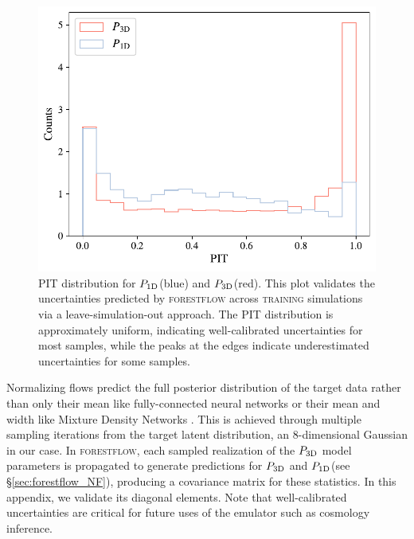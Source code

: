 \documentclass{aa}
\newcommand{\poned}{\ensuremath{P_{\rm 1D}}\xspace}
\newcommand{\pthreed}{\ensuremath{P_{\rm 3D}}\xspace}
\newcommand{\forestflow}{\textsc{forestflow}\xspace}
\newcommand{\lacehc}{\textsc{training}\xspace}
\begin{document}
\begin{appendix}
\begin{figure}
    \centering\includegraphics[width=\columnwidth]{figures/PIT_P3D.pdf}
    \caption{PIT distribution for \poned (blue) and \pthreed (red). This plot validates the uncertainties predicted by \forestflow across \lacehc simulations via a leave-simulation-out approach. The PIT distribution is approximately uniform, indicating well-calibrated uncertainties for most samples, while the peaks at the edges indicate underestimated uncertainties for some samples.}
    \label{fig:PIT}
\end{figure}

Normalizing flows predict the full posterior distribution of the target data rather than only their mean like fully-connected neural networks or their mean and width like Mixture Density Networks \citep[see][for some applications in cosmology]{ramachandra2022MachineLearningSynthetic, cabayol-garcia2023NeuralNetworkEmulator}. This is achieved through multiple sampling iterations from the target latent distribution, an 8-dimensional Gaussian in our case. In \forestflow, each sampled realization of the \pthreed model parameters is propagated to generate predictions for \pthreed and \poned (see \S\ref{sec:forestflow_NF}), producing a covariance matrix for these statistics. In this appendix, we validate its diagonal elements. Note that well-calibrated uncertainties are critical for future uses of the emulator such as cosmology inference.


\end{appendix}
\end{document}
